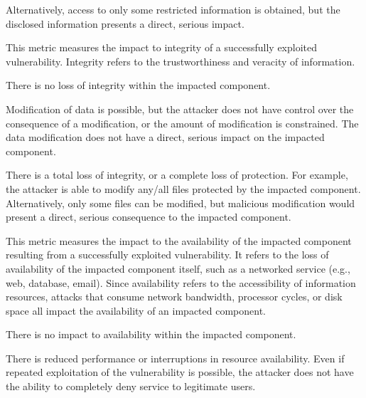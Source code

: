 \begin{description}[itemsep=1em,align=left]
\begin{description}[noitemsep,align=left]
                    Alternatively, access to only some restricted information is obtained, but the disclosed information presents a direct, serious impact.
            \end{description}
        \item [Integrity:] This metric measures the impact to integrity of a successfully exploited vulnerability. 
            Integrity refers to the trustworthiness and veracity of information.
            \begin{description}[noitemsep,align=left]
                \item [None:] There is no loss of integrity within the impacted component.
                \item [Low:] Modification of data is possible, but the attacker does not have control over the consequence of a modification, or the amount of modification is constrained. 
                    The data modification does not have a direct, serious impact on the impacted component.
                \item [High:] There is a total loss of integrity, or a complete loss of protection. 
                    For example, the attacker is able to modify any/all files protected by the impacted component. 
                    Alternatively, only some files can be modified, but malicious modification would present a direct, serious consequence to the impacted component.
            \end{description}
        \item [Availability:] This metric measures the impact to the availability of the impacted component resulting from a successfully exploited vulnerability. 
            It refers to the loss of availability of the impacted component itself, such as a networked service (e.g., web, database, email). 
            Since availability refers to the accessibility of information resources, attacks that consume network bandwidth, processor cycles, or disk space all impact the availability of an impacted component.
            \begin{description}[noitemsep,align=left]
                \item [None:] There is no impact to availability within the impacted component.
                \item [Low:] There is reduced performance or interruptions in resource availability. 
                    Even if repeated exploitation of the vulnerability is possible, the attacker does not have the ability to completely deny service to legitimate users. 

\end{description}
\end{description}
